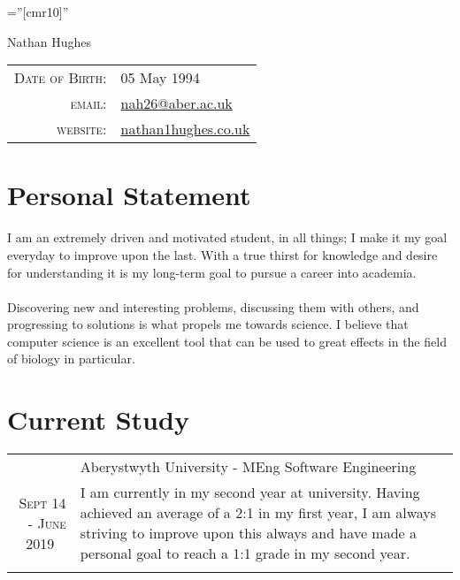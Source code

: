 \documentclass[a4paper,10pt]{article}
\begin{document}
\pagestyle{empty} %

\font\fb=''[cmr10]'' %

\par{\centering
  {\Huge Nathan {Hughes}
  }\bigskip\par}


\begin{center}
  \begin{tabular}{rl}
    \textsc{Date of Birth:} & 05 		May 1994 \\
    \textsc{email:}     & \href{mailto:nah26@aber.ac.uk}{nah26@aber.ac.uk}\\
    \textsc{website:}  & \href{nathan1hughes.co.uk}{nathan1hughes.co.uk}
                      
  \end{tabular}
\end{center}


\section{Personal Statement}
I am an extremely driven and motivated student, in all things; I make it my goal everyday to improve upon the last. With a true thirst for knowledge and desire for understanding it is my long-term goal to pursue a career into academia. \\
\\
Discovering new and interesting problems, discussing them with others, and progressing to solutions is what propels me towards science.
I believe that computer science is an excellent tool that can be used to great effects in the field of biology in particular.


\section{Current Study}


\begin{tabular}{rp{11cm}}
  &Aberystwyth University - MEng Software Engineering\\\textsc{Sept 14 - June 2019 \  }&\footnotesize{I am currently in my second year at university. Having achieved an average of a 2:1 in my first year, I am always striving to improve upon this always and have made a personal goal to reach a 1:1 grade in my second year.}\\\multicolumn{2}{c}{} \\
  


\end{tabular}
\end{document}
